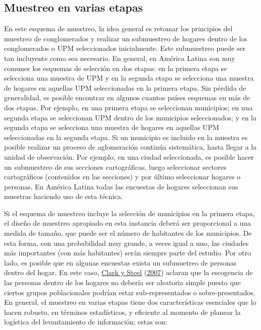 \documentclass[
  12pt,
  spanish,
]{book}
\begin{document}
\hypertarget{muestreo-en-varias-etapas}{%
\subsection*{Muestreo en varias etapas}\label{muestreo-en-varias-etapas}}

En este esquema de muestreo, la idea general es retomar los principios del muestreo de conglomerados y realizar un submuestreo de hogares dentro de los conglomerados o UPM seleccionados inicialmente. Este submuestreo puede ser tan incluyente como sea necesario. En general, en América Latina son muy comunes los esquemas de selección en dos etapas: en la primera etapa se selecciona una muestra de UPM y en la segunda etapa se selecciona una muestra de hogares en aquellas UPM seleccionadas en la primera etapa. Sin pérdida de generalidad, es posible encontrar en algunos cuantos países esquemas en más de dos etapas. Por ejemplo, en una primera etapa se seleccionan municipios; en una segunda etapa se seleccionan UPM dentro de los municipios seleccionados; y en la segunda etapa se selecciona una muestra de hogares en aquellas UPM seleccionadas en la segunda etapa. Si un municipio es incluido en la muestra es posible realizar un proceso de aglomeración continúa sistemática, hasta llegar a la unidad de observación. Por ejemplo, en una ciudad seleccionada, es posible hacer un submuestreo de sus secciones cartográficas, luego seleccionar sectores cartográficos (contenidos en las secciones) y por último seleccionar hogares o personas. En América Latina todas las encuestas de hogares seleccionan sus muestras haciendo uso de esta técnica.

Si el esquema de muestreo incluye la selección de municipios en la primera etapa, el diseño de muestreo apropiado en esta instancia deberá ser proporcional a una medida de tamaño, que puede ser el número de habitantes de los municipios. De esta forma, con una probabilidad muy grande, a veces igual a uno, las ciudades más importantes (con más habitantes) serán siempre parte del estudio. Por otro lado, es posible que en algunas encuestas exista un submuetreo de personas dentro del hogar. En este caso, \protect\hyperlink{ref-Clark_Steel_2007}{Clark y Steel} (\protect\hyperlink{ref-Clark_Steel_2007}{2007}) aclaran que la escogencia de las personas dentro de los hogares no debería ser aleatoria simple puesto que ciertos grupos poblacionales podrían estar sub-representados o sobre-presentados. En general, el muestreo en varias etapas tiene dos características esenciales que lo hacen robusto, en términos estadísticos, y eficiente al momento de planear la logística del levantamiento de información; estas son:
\end{document}
